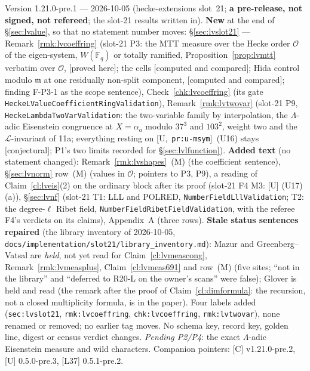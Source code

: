 \documentclass[11pt]{article}
\theoremstyle{remark}
\newcommand{\F}{\mathbb{F}}
\newcommand{\m}{\mathfrak{m}}
\newcommand{\PROVED}{\textsf{[proved here]}}
\newcommand{\CONJ}{\textsf{[conjectural]}}
\newcommand{\CMPD}{\textsf{[computed and compared]}}   %
\newcommand{\Ucite}[1]{[U,~\texttt{#1}]}               %
\begin{document}
Version 1.21.0-pre.1 --- 2026-10-05 (hecke-extensions slot~21; \textbf{a pre-release, not signed, not refereed}; the slot-21 results written in). \textbf{New} at the end of
\S\ref{sec:lvalue}, so that no statement number moves: \S\ref{sec:lvslot21} --- Remark~\ref{rmk:lvcoeffring} (slot-21 P3: the MTT measure over the Hecke order $\mathcal O$ of the eigen-system,
$W(\F_q)$ or totally ramified, Proposition~\ref{prop:lvmtt} verbatim over $\mathcal O$, \PROVED; the cells \CMPD; Hida control modulo $\m$ at one residually non-split component, \CMPD; finding F-P3-1
as the scope sentence), Check~\ref{chk:lvcoeffring} (its gate \texttt{HeckeLValueCoefficientRingValidation}), Remark~\ref{rmk:lvtwovar} (slot-21 P9, \texttt{HeckeLambdaTwoVarValidation}: the
two-variable family by interpolation, the $\Lambda$-adic Eisenstein congruence at $X=\alpha_a$ modulo $37^{3}$ and $103^{2}$, weight two and the $\mathcal L$-invariant of 11a; everything resting on
\Ucite{pr:u-msym}~(U16) stays \CONJ; P1's two limits recorded for \S\ref{sec:lvlfunction}). \textbf{Added text} (no statement changed): Remark~\ref{rmk:lvshapes}~(M) (the coefficient
sentence), \S\ref{sec:lvnorm} row~(M) (values in $\mathcal O$; pointers to P3, P9), a reading of Claim~\ref{cl:lveis}(2) on the ordinary block after its proof (slot-21 F4 M3: [U] (U17)(a)),
\S\ref{sec:lvnf} (slot-21 T1: LLL and POLRED, \texttt{NumberFieldLllValidation}; T2: the degree-$\ell$ Ribet field, \texttt{NumberFieldRibetFieldValidation}, with the referee F4's verdicts on
its claims), Appendix~A (three rows). \textbf{Stale status sentences repaired} (the library inventory of 2026-10-05, \texttt{docs/implementation/slot21/library\_inventory.md}): Mazur and
Greenberg--Vatsal are \emph{held}, not yet read for Claim~\ref{cl:lvmeascong}, Remark~\ref{rmk:lvmeasplus}, Claim~\ref{cl:lvmeas691} and row~(M) (five sites; ``not in the library'' and ``deferred
to R20-L on the owner's scans'' were false); Glover is held and read (the remark after the proof of Claim~\ref{cl:dimformula}: the recursion, not a closed multiplicity formula, is in the paper).
Four labels added (\texttt{sec:lvslot21}, \texttt{rmk:lvcoeffring}, \texttt{chk:lvcoeffring}, \texttt{rmk:lvtwovar}), none renamed or removed; no earlier tag moves. No schema key, record key,
golden line, digest or census verdict changes. \emph{Pending P2/P4}: the exact $\Lambda$-adic Eisenstein measure and wild characters. Companion pointers: [C] v1.21.0-pre.2, [U] 0.5.0-pre.3, [L37] 0.5.1-pre.2.
\end{document}
